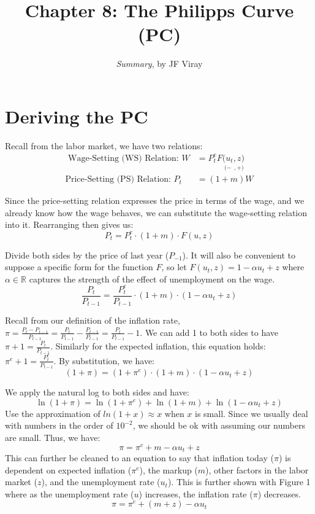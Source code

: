 \documentclass{extarticle}
\title{\vspace{-2em}Chapter 8: The Philipps Curve (PC)}
\author{\emph{Summary}, by JF Viray}
\date{}
\begin{document}
\maketitle

\section{Deriving the PC}
Recall from the labor market, we have two relations:
\begin{align*}
    \text{ Wage-Setting (WS) Relation: } W &= P_t^e F\underset{(-}{(u_t}\underset{, +)}{, z)}  \\
    \text{Price-Setting (PS) Relation: } P_t &= (1+m) W 
\end{align*}

Since the price-setting relation expresses the price in terms of the wage, and we already know how the wage behaves, we can substitute the wage-setting relation into it. Rearranging then gives us:
$$P_t = P_t^e \cdot (1+m)  \cdot F(u, z)$$

Divide both sides by the price of last year ($P_{-1}$). It will also be convenient to suppose a specific form for the function $F$, so let $F(u_t, z) = 1 - \alpha u_t + z$ where $\alpha \in \mathbb{R}$ captures the strength of the effect of unemployment on the wage.
$$\frac{P_t}{P_{t-1}} = \frac{P_t^e}{P_{t-1}} \cdot (1+m) \cdot (1-\alpha u_t + z)$$

Recall from our definition of the inflation rate, $\pi = \frac{P_t - P_{t-1}}{P_{t-1}} = \frac{P_t}{P_{t-1}} - \frac{P_{t-1}}{P_{t-1}} = \frac{P_t}{P_{t-1}} - 1$. We can add 1 to both sides to have $\pi + 1 = \frac{P_t}{P_{t-1}}$. 
Similarly for the expected inflation, this equation holds: $\pi^e + 1 = \frac{P_t^e}{P_{t-1}}$. By substitution, we have:
$$(1+\pi) = (1+\pi^e) \cdot (1+m) \cdot (1-\alpha u_t + z)$$ 

We apply the natural log to both sides and have:
$$\ln (1+\pi) = \ln (1+\pi^e) + \ln (1+m) + \ln (1-\alpha u_t + z)$$
Use the approximation of $ln(1+x) \approx x$ when $x$ is small. Since we usually deal with numbers in the order of $10^{-2}$, we should be ok with assuming our numbers are small. Thus, we have:
$$\pi = \pi^e + m - \alpha u_t + z$$
This can further be cleaned to an equation to say that inflation today ($\pi$) is dependent on expected inflation ($\pi^e$), the markup ($m$), other factors in the labor market ($z$), and the unemployment rate ($u_t$). This is further shown with Figure 1 where as the unemployment rate ($u$) increases, the inflation rate ($\pi$) decreases.
$$\pi = \pi^e + (m+z) - \alpha u_t$$
\end{document}
